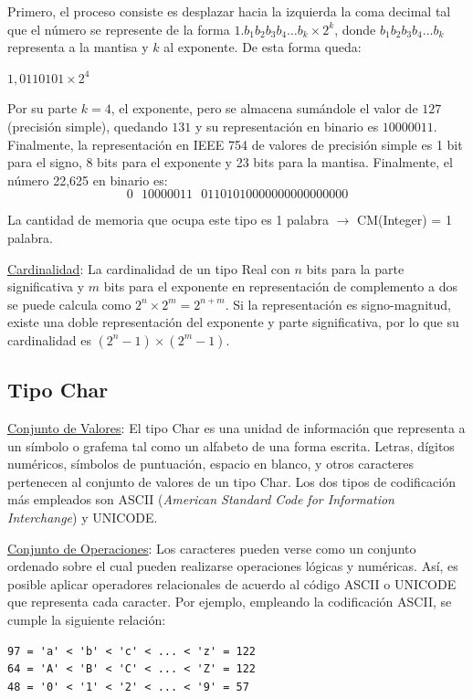 Primero, el proceso consiste es desplazar hacia la izquierda la coma decimal tal que el número se represente de la forma $1.b_1b_2b_3b_4 \dots b_k \times 2^k$, donde $b_1b_2b_3b_4 \dots b_k$ representa a la mantisa y $k$ al exponente. De esta forma queda:

\begin{center}
$1,0110101 \times 2^4$
\end{center}

Por su parte $k=4$, el exponente, pero se almacena sumándole el valor de $127$ (precisión simple), quedando $131$ y su representación en binario es $10000011$. Finalmente, la representación en IEEE 754 de valores de precisión simple es 1 bit para el signo, 8 bits para el exponente y 23 bits para la mantisa. Finalmente, el número 22,625 en binario es:
$$0\mbox{ }10000011\mbox{ }01101010000000000000000$$

La cantidad de memoria que ocupa este tipo es 1 palabra $\rightarrow$ CM(Integer) = 1 palabra.

\underline{Cardinalidad}: La cardinalidad de un tipo Real con $n$ bits para la parte significativa y $m$ bits para el exponente en representación de complemento a dos se puede calcula como $2^n \times 2^m = 2^{n+m}$. Si la representación es signo-magnitud, existe una doble representación del exponente y parte significativa, por lo que su cardinalidad es $(2^n - 1)\times(2^m - 1)$.

\subsection{Tipo Char}

\underline{Conjunto de Valores}: El tipo Char es una unidad de información que representa a un símbolo o grafema tal como un alfabeto de una forma escrita. Letras, dígitos numéricos, símbolos de puntuación, espacio en blanco, y otros caracteres pertenecen al conjunto de valores de un tipo Char. Los dos tipos de codificación más empleados son ASCII (\textit{American Standard Code for Information Interchange}) y UNICODE.

\underline{Conjunto de Operaciones}: Los caracteres pueden verse como un conjunto ordenado sobre el cual pueden realizarse operaciones lógicas y numéricas. Así, es posible aplicar operadores relacionales de acuerdo al código ASCII o UNICODE que representa cada caracter. Por ejemplo, empleando la codificación ASCII, se cumple la siguiente relación:

\begin{lstlisting}[upquote=true, language=pseudo]
97 = 'a' < 'b' < 'c' < ... < 'z' = 122
64 = 'A' < 'B' < 'C' < ... < 'Z' = 122
48 = '0' < '1' < '2' < ... < '9' = 57
\end{lstlisting}

